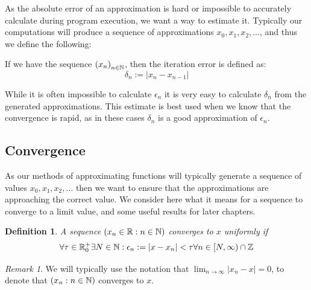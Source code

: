 As the absolute error of an approximation is hard or impossible to accurately calculate during program execution, we want a way to estimate it. Typically our computations will produce a sequence of approximations \(x_0, x_1, x_2, \ldots\), and thus we define the following:

\begin{Iteration Error}
\label{DEF_"Iteration Error"}
If we have the sequence \(\left(x_n\right)_{n \in \mathbb{N}}\), then the iteration error is defined as:
\[ \delta_n := \left|x_n - x_{n-1}\right| \]
\end{Iteration Error}

While it is often impossible to calculate \(\epsilon_n\) it is very easy to calculate \(\delta_n\) from the generated approximations. This estimate is best used when we know that the convergence is rapid, as in these cases \(\delta_n\) is a good approximation of \(\epsilon_n\).

\subsection{Convergence}
\label{SEC_"Convergence"}

\newtheorem{Uniform Convergence}{Definition}[subsection]
\newtheorem{Rate of Convergence}[Uniform Convergence]{Definition}

\theoremstyle{remark}
\newtheorem{Uniform Convergence R1}{Remark}[Uniform Convergence]

\theoremstyle{plain}
\newtheorem{Uniform Convergence Thm}{Theorem}[subsection]
\newtheorem{Quad Convergence of Newton}[Uniform Convergence Thm]{Theorem}

As our methods of approximating functions will typically generate a sequence of values \(x_0, x_1, x_2, \ldots\) then we want to ensure that the approximations are approaching the correct value. We consider here what it means for a sequence to converge to a limit value, and some useful results for later chapters.

\begin{Uniform Convergence}
\label{DEF_"Uniform Convergence"}
A sequence \((x_n \in \mathbb{R}: n \in \mathbb{N})\) converges to \(x\) uniformly if \[\forall \tau \in \mathbb{R}^+_0 \exists N \in \mathbb{N} : \epsilon_n := |x - x_n| < \tau \forall n \in [N, \infty) \cap \mathbb{Z}\]
\end{Uniform Convergence}

\begin{Uniform Convergence R1}
\label{RMK_"Uniform Convergence R1"}
We will typically use the notation that \(\lim_{n \to \infty} |x_n - x| = 0\), to denote that \((x_n : n \in \mathbb{N})\) converges to \(x\).
\end{Uniform Convergence R1}

